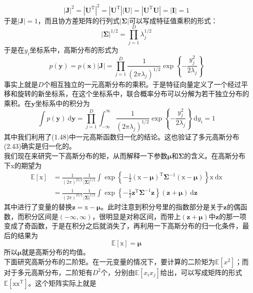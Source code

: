 \documentclass[b5paper]{book}
\numberwithin{equation}{chapter}
\newcommand {\bx} {\boldsymbol{\mathrm{x}}}
\newcommand {\rmT} {\mathrm{T}}
\newcommand {\bfMu} {\boldsymbol{\mu}}
\newcommand {\bfSigma} {\boldsymbol{\Sigma}}
\begin{document}
{	\begin{equation}
		|\mathbf{J}|^2 = |\mathbf{U}^{\rmT}|^2 = |\mathbf{U}^{\rmT}||\mathbf{U}|=|\mathbf{U}^{\rmT}\mathbf{U}|=|\mathbf{I}|=1
	\end{equation}
	于是$|\mathbf{J}|=1$，而且协方差矩阵的行列式$|\bfSigma|$可以写成特征值乘积的形式：
	\begin{equation}
		|\bfSigma|^{1/2}=\prod_{j=1}^D\lambda_j^{1/2}
	\end{equation}
	于是在$y_i$坐标系中，高斯分布的形式为
	\begin{equation}
		p(\mathbf{y})=p(\mathbf{x})|\mathbf{J}| = \prod_{j=1}^D\frac{1}{(2\pi\lambda_j)^{1/2}}\exp\left\{-\frac{y_j^2}{2\lambda_j}\right\}
	\end{equation}
	事实上就是$D$个相互独立的一元高斯分布的乘积。于是特征向量定义了一个经过平移和旋转的新坐标系，在这个坐标系中，联合概率分布可以分解为若干独立分布的乘积。在$\mathbf{y}$坐标系中的积分为
	\begin{equation}
		\int p(\mathbf{y})\ \mathrm{d}\mathbf{y} = \prod_{j=1}^D\int_{-\infty}^{\infty}\frac{1}{(2\pi\lambda_j)^{1/2}}\exp \left\{-\frac{y_j^2}{2\lambda_j}\right\}\ \mathrm{d}y_i=1
	\end{equation}
	其中我们利用了(1.48)中一元高斯函数归一化的结论。这也验证了多元高斯分布(2.43)确实是归一化的。\\
	\indent 我们现在来研究一下高斯分布的矩，从而解释一下参数$\bfMu$和$\bfSigma$的含义。在高斯分布下$\bx$的期望为
	\begin{equation}
	\begin{split}
		\mathbb{E}[\bx] &= \frac{1}{(2\pi)^{D/2}} \frac{1}{|\bfSigma|^{1/2}}\int \exp \left\{-\frac{1}{2}(\bx-\bfMu)^{\rmT}\bfSigma^{-1}(\bx-\bfMu)\right\}\bx \ \mathrm{d}\bx \\
		&=\frac{1}{(2\pi)^{D/2}} \frac{1}{|\bfSigma|^{1/2}}\int \exp \left\{-\frac{1}{2}\mathbf{z}^{\rmT}\bfSigma^{-1}\mathbf{z}\right\}(\mathbf{z}+\bfMu) \ \mathrm{d}\mathbf{z}
	\end{split}
	\end{equation}
	其中进行了变量的替换$\mathbf{z}=\bx-\bfMu$。此时注意到积分号里的指数部分是关于$\mathbf{z}$的偶函数，而积分区间是$(-\infty,\infty)$，很明显是对称区间，而带上$(\mathbf{z}+\bfMu)$中$\mathbf{z}$的那一项变成了奇函数，于是在积分之后就消失了，再利用一下高斯分布的归一化条件，最后的结果为
	\begin{equation}
		\mathbb{E}[\bx]=\bfMu
	\end{equation}
	所以$\bfMu$就是高斯分布的均值。\\
	\indent 下面研究高斯分布的二阶矩。在一元变量的情况下，要计算的二阶矩为$\mathbb{E}[x^2]$；而对于多元高斯分布，二阶矩有$D^2$个，分别由$\mathbb{E}[x_i x_j]$给出，可以写成矩阵的形式$\mathbb{E}[\bx\bx^{\rmT}]$。这个矩阵实际上就是
}
\end{document}

